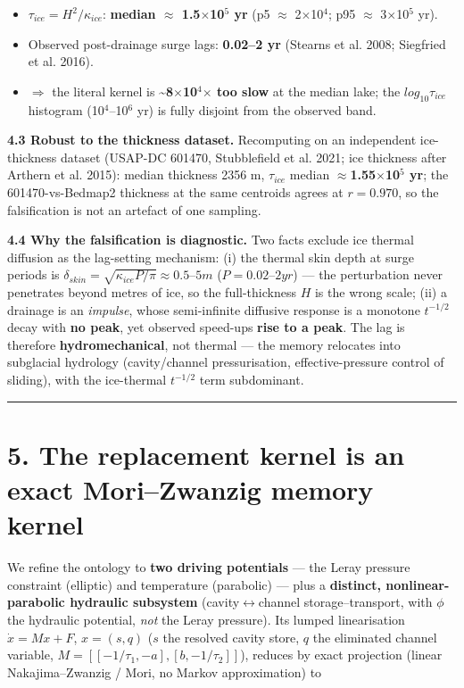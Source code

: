 \documentclass[11pt]{article}
\begin{document}
\begin{itemize}
\item $\tau _{ice} = H^{2}/\kappa _{ice}$: \textbf{median \ensuremath{\approx} 1.5\ensuremath{\times}10\ensuremath{^{5}} yr} (p5 \ensuremath{\approx} 2\ensuremath{\times}10\ensuremath{^{4}}; p95 \ensuremath{\approx} 3\ensuremath{\times}10\ensuremath{^{5}} yr).
\item Observed post-drainage surge lags: \textbf{0.02–2 yr} (Stearns et al. 2008; Siegfried et al. 2016).
\item \ensuremath{\Rightarrow} the literal kernel is \textbf{\textasciitilde{}8\ensuremath{\times}10\ensuremath{^{4}}\ensuremath{\times} too slow} at the median lake; the $log_{10} \tau _{ice}$ histogram (10\ensuremath{^{4}}–10\ensuremath{^{6}} yr) is fully disjoint from the observed band.
\end{itemize}


\textbf{4.3 Robust to the thickness dataset.} Recomputing on an independent ice-thickness dataset (USAP-DC 601470, Stubblefield et al. 2021; ice thickness after Arthern et al. 2015): median thickness 2356 m, $\tau _{ice}$ median \textbf{\ensuremath{\approx}1.55\ensuremath{\times}10\ensuremath{^{5}} yr}; the 601470-vs-Bedmap2 thickness at the same centroids agrees at \textbf{$r=0.970$}, so the falsification is not an artefact of one sampling.


\textbf{4.4 Why the falsification is diagnostic.} Two facts exclude ice thermal diffusion as the lag-setting mechanism: (i) the thermal skin depth at surge periods is $\delta _{skin}=\sqrt{\kappa _{ice} P/\pi }\approx 0.5–5 m$ ($P=0.02–2 yr$) — the perturbation never penetrates beyond metres of ice, so the full-thickness $H$ is the wrong scale; (ii) a drainage is an \emph{impulse}, whose semi-infinite diffusive response is a monotone $t^{-1/2}$ decay with \textbf{no peak}, yet observed speed-ups \textbf{rise to a peak}. The lag is therefore \textbf{hydromechanical}, not thermal — the memory relocates into subglacial hydrology (cavity/channel pressurisation, effective-pressure control of sliding), with the ice-thermal $t^{-1/2}$ term subdominant.


\medskip\hrule\medskip


\section*{5. The replacement kernel is an exact Mori–Zwanzig memory kernel}


We refine the ontology to \textbf{two driving potentials} — the Leray pressure constraint (elliptic) and temperature (parabolic) — plus a \textbf{distinct, nonlinear-parabolic hydraulic subsystem} (cavity\ensuremath{\leftrightarrow}channel storage–transport, with $\phi $ the hydraulic potential, \emph{not} the Leray pressure). Its lumped linearisation $\dot{x}=Mx+F$, $x=(s,q)$ ($s$ the resolved cavity store, $q$ the eliminated channel variable, $M=[[-1/\tau _{1},-a],[b,-1/\tau _{2}]]$), reduces by exact projection (linear Nakajima–Zwanzig / Mori, no Markov approximation) to
\end{document}
